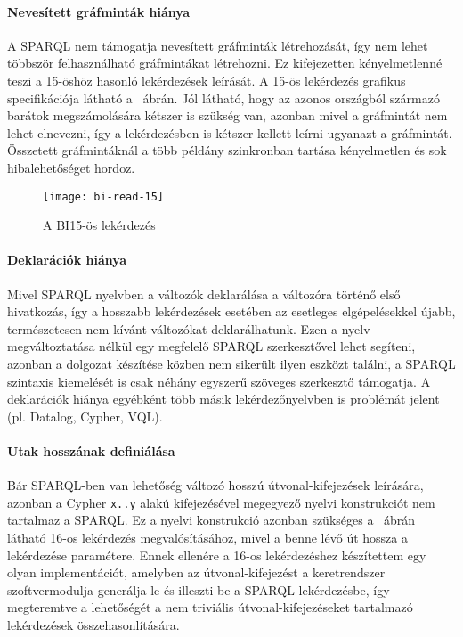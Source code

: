 \paragraph{Nevesített gráfminták hiánya}
A SPARQL nem támogatja nevesített gráfminták létrehozását, így nem lehet többször felhasználható gráfmintákat létrehozni. Ez kifejezetten kényelmetlenné teszi a 15-öshöz hasonló lekérdezések leírását. A 15-ös lekérdezés grafikus specifikációja látható a ~ábrán. Jól látható, hogy az azonos országból származó barátok megszámolására kétszer is szükség van, azonban mivel a gráfmintát nem lehet elnevezni, így a lekérdezésben is kétszer kellett leírni ugyanazt a gráfmintát. Összetett gráfmintáknál a több példány szinkronban tartása kényelmetlen és sok hibalehetőséget hordoz.

\begin{figure}[!ht]
	\centering
	\texttt{[image: bi-read-15]}
	\caption[]{A BI15-ös lekérdezés}
	\label{fig:bi15}
\end{figure}

\paragraph{Deklarációk hiánya}
Mivel SPARQL nyelvben a változók deklarálása a változóra történő első hivatkozás, így a hosszabb lekérdezések esetében az esetleges elgépelésekkel újabb, természetesen nem kívánt változókat deklarálhatunk. Ezen a nyelv megváltoztatása nélkül egy megfelelő SPARQL szerkesztővel lehet segíteni, azonban a dolgozat készítése közben nem sikerült ilyen eszközt találni, a SPARQL szintaxis kiemelését is csak néhány egyszerű szöveges szerkesztő támogatja. A deklarációk hiánya egyébként több másik lekérdezőnyelvben is problémát jelent (pl. Datalog, Cypher, VQL).

\paragraph{Utak hosszának definiálása}
Bár SPARQL-ben van lehetőség változó hosszú útvonal-kifejezések leírására, azonban a Cypher \lstinline{x..y} alakú kifejezésével megegyező nyelvi konstrukciót nem tartalmaz a SPARQL. Ez a nyelvi konstrukció azonban szükséges a ~ábrán látható 16-os lekérdezés megvalósításához, mivel a benne lévő út hossza a lekérdezése paramétere. Ennek ellenére a 16-os lekérdezéshez készítettem egy olyan implementációt, amelyben az útvonal-kifejezést a keretrendszer szoftvermodulja generálja le és illeszti be a SPARQL lekérdezésbe, így megteremtve a lehetőségét a nem triviális útvonal-kifejezéseket tartalmazó lekérdezések összehasonlítására.

